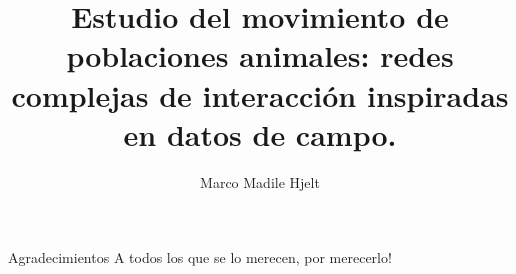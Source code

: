 \documentclass[12pt,screen,twoside,pagebackref]{ibtesis}
\title{Estudio del movimiento de poblaciones animales: redes complejas de interacción inspiradas en datos de campo.}
\author{Marco Madile Hjelt}
\begin{document}

\begin{preliminary}




\tableofcontents                %

\listoffigures                  %

\listoftables                   %



\end{preliminary}







%

\begin{biblio}

\end{biblio}


\begin{postliminary}


\begin{seccion}{Agradecimientos}
A todos los que se lo merecen, por merecerlo!
\end{seccion}

\end{postliminary}
\end{document}

